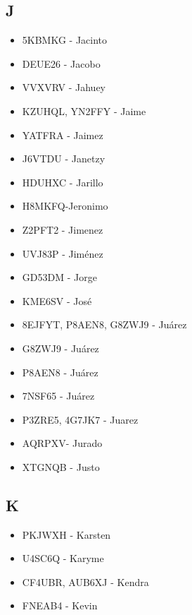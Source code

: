 \subsection*{J}
\begin{itemize}[leftmargin=*,nosep]
\item 5KBMKG  -  Jacinto
\item DEUE26 - Jacobo
\item VVXVRV - Jahuey
\item KZUHQL, YN2FFY - Jaime
\item YATFRA - Jaimez
\item J6VTDU - Janetzy
\item HDUHXC - Jarillo
\item H8MKFQ-Jeronimo
\item Z2PFT2 -  Jimenez
\item UVJ83P - Jiménez
\item GD53DM - Jorge
\item KME6SV - José
\item 8EJFYT, P8AEN8, G8ZWJ9 - Juárez
\item G8ZWJ9 - Juárez
\item P8AEN8 - Juárez
\item 7NSF65 - Juárez
\item P3ZRE5, 4G7JK7 - Juarez
\item AQRPXV- Jurado
\item XTGNQB - Justo
\end{itemize}

\subsection*{K}
\begin{itemize}[leftmargin=*,nosep]
\item PKJWXH  -  Karsten
\item U4SC6Q  -  Karyme
\item CF4UBR, AUB6XJ - Kendra
\item FNEAB4 - Kevin
\end{itemize}

